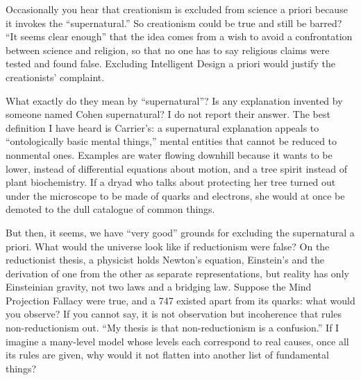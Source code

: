 
Occasionally you hear that creationism is excluded from science a priori because it invokes the ``supernatural.''  So creationism could be true and still be barred? ``It seems clear enough'' that the idea comes from a wish to avoid a confrontation between science and religion, so that no one has to say religious claims were tested and found false.  Excluding Intelligent Design a priori would justify the creationists' complaint. 

What exactly do they mean by ``supernatural''? Is any explanation invented by someone named Cohen supernatural? I do not report their answer.  The best definition I have heard is Carrier's: a supernatural explanation appeals to ``ontologically basic mental things,'' mental entities that cannot be reduced to nonmental ones. Examples are water flowing downhill because it wants to be lower, instead of differential equations about motion, and a tree spirit instead of plant biochemistry. If a dryad who talks about protecting her tree turned out under the microscope to be made of quarks and electrons, she would at once be demoted to the dull catalogue of common things. 

But then, it seems, we have ``very good'' grounds for excluding the supernatural a priori. What would the universe look like if reductionism were false? On the reductionist thesis, a physicist holds Newton's equation, Einstein's and the derivation of one from the other as separate representations, but reality has only Einsteinian gravity, not two laws and a bridging law. Suppose the Mind Projection Fallacy were true, and a 747 existed apart from its quarks: what would you observe?  If you cannot say, it is not observation but incoherence that rules non-reductionism out. ``My thesis is that non-reductionism is a confusion.'' If I imagine a many-level model whose levels each correspond to real causes, once all its rules are given, why would it not flatten into another list of fundamental things?

